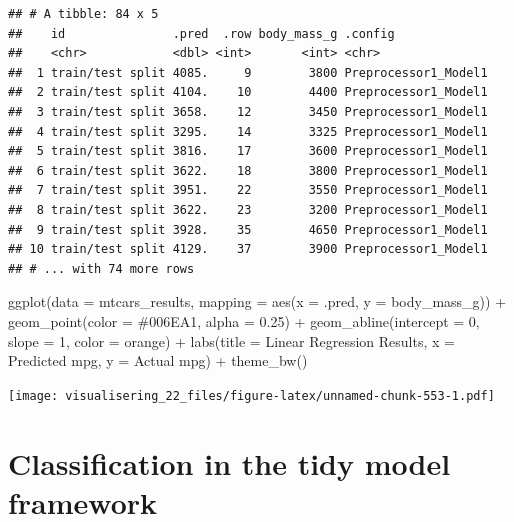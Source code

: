 \documentclass[
]{book}
\newenvironment{Shaded}{\begin{snugshade}}{\end{snugshade}}
\newcommand{\AttributeTok}[1]{\textcolor[rgb]{0.77,0.63,0.00}{#1}}
\newcommand{\DecValTok}[1]{\textcolor[rgb]{0.00,0.00,0.81}{#1}}
\newcommand{\FloatTok}[1]{\textcolor[rgb]{0.00,0.00,0.81}{#1}}
\newcommand{\FunctionTok}[1]{\textcolor[rgb]{0.00,0.00,0.00}{#1}}
\newcommand{\NormalTok}[1]{#1}
\newcommand{\SpecialCharTok}[1]{\textcolor[rgb]{0.00,0.00,0.00}{#1}}
\newcommand{\StringTok}[1]{\textcolor[rgb]{0.31,0.60,0.02}{#1}}
\begin{document}
\begin{verbatim}
## # A tibble: 84 x 5
##    id               .pred  .row body_mass_g .config             
##    <chr>            <dbl> <int>       <int> <chr>               
##  1 train/test split 4085.     9        3800 Preprocessor1_Model1
##  2 train/test split 4104.    10        4400 Preprocessor1_Model1
##  3 train/test split 3658.    12        3450 Preprocessor1_Model1
##  4 train/test split 3295.    14        3325 Preprocessor1_Model1
##  5 train/test split 3816.    17        3600 Preprocessor1_Model1
##  6 train/test split 3622.    18        3800 Preprocessor1_Model1
##  7 train/test split 3951.    22        3550 Preprocessor1_Model1
##  8 train/test split 3622.    23        3200 Preprocessor1_Model1
##  9 train/test split 3928.    35        4650 Preprocessor1_Model1
## 10 train/test split 4129.    37        3900 Preprocessor1_Model1
## # ... with 74 more rows
\end{verbatim}

\begin{Shaded}
\begin{Highlighting}[]
\FunctionTok{ggplot}\NormalTok{(}\AttributeTok{data =}\NormalTok{ mtcars\_results,}
       \AttributeTok{mapping =} \FunctionTok{aes}\NormalTok{(}\AttributeTok{x =}\NormalTok{ .pred, }\AttributeTok{y =}\NormalTok{ body\_mass\_g)) }\SpecialCharTok{+}
  \FunctionTok{geom\_point}\NormalTok{(}\AttributeTok{color =} \StringTok{\textquotesingle{}\#006EA1\textquotesingle{}}\NormalTok{, }\AttributeTok{alpha =} \FloatTok{0.25}\NormalTok{) }\SpecialCharTok{+}
  \FunctionTok{geom\_abline}\NormalTok{(}\AttributeTok{intercept =} \DecValTok{0}\NormalTok{, }\AttributeTok{slope =} \DecValTok{1}\NormalTok{, }\AttributeTok{color =} \StringTok{\textquotesingle{}orange\textquotesingle{}}\NormalTok{) }\SpecialCharTok{+}
  \FunctionTok{labs}\NormalTok{(}\AttributeTok{title =} \StringTok{\textquotesingle{}Linear Regression Results\textquotesingle{}}\NormalTok{,}
       \AttributeTok{x =} \StringTok{\textquotesingle{}Predicted mpg\textquotesingle{}}\NormalTok{,}
       \AttributeTok{y =} \StringTok{\textquotesingle{}Actual mpg\textquotesingle{}}\NormalTok{) }\SpecialCharTok{+} \FunctionTok{theme\_bw}\NormalTok{()}
\end{Highlighting}
\end{Shaded}

\texttt{[image: visualisering\_22\_files/figure-latex/unnamed-chunk-553-1.pdf]}

\hypertarget{classification-in-the-tidy-model-framework}{%
\section{Classification in the tidy model framework}\label{classification-in-the-tidy-model-framework}}
\end{document}
